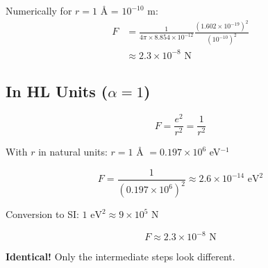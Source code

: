 	Numerically for $r = 1$ Å = $10^{-10}$ m:
	\begin{align}
		F &= \frac{1}{4\pi \times 8.854 \times 10^{-12}} \frac{(1.602 \times 10^{-19})^2}{(10^{-10})^2} \\
		&\approx 2.3 \times 10^{-8} \text{ N}
	\end{align}
	
	\subsection{In HL Units ($\alpha = 1$)}
	
	\begin{equation}
		F = \frac{e^2}{r^2} = \frac{1}{r^2}
	\end{equation}
	
	With $r$ in natural units: $r = 1$ Å $= 0.197 \times 10^6$ eV$^{-1}$
	
	\begin{equation}
		F = \frac{1}{(0.197 \times 10^6)^2} \approx 2.6 \times 10^{-14} \text{ eV}^2
	\end{equation}
	
	Conversion to SI: $1 \text{ eV}^2 \approx 9 \times 10^5$ N
	
	\begin{equation}
		F \approx 2.3 \times 10^{-8} \text{ N}
	\end{equation}
	
	\textbf{Identical!} Only the intermediate steps look different.
	